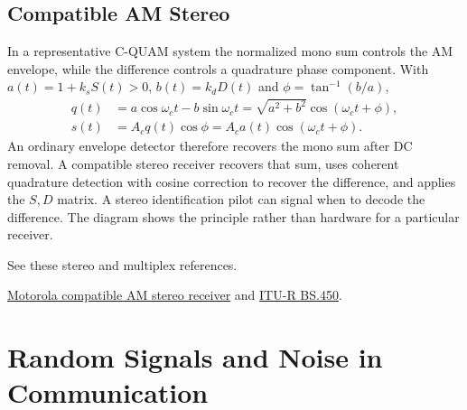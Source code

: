 \documentclass[12pt,a4paper]{article}
\begin{document}
\subsection{Compatible AM Stereo}
In a representative C-QUAM system the normalized mono sum controls the AM envelope, while the difference controls a quadrature phase component. With $a(t)=1+k_s S(t)>0$, $b(t)=k_dD(t)$ and $\phi=\tan^{-1}(b/a)$,
\[
\begin{aligned}
 q(t)&=a\cos\omega_ct-b\sin\omega_ct
      =\sqrt{a^2+b^2}\cos(\omega_ct+\phi),\\
 s(t)&=A_cq(t)\cos\phi
      =A_c a(t)\cos(\omega_ct+\phi).
\end{aligned}
\]
An ordinary envelope detector therefore recovers the mono sum after DC removal. A compatible stereo receiver recovers that sum, uses coherent quadrature detection with cosine correction to recover the difference, and applies the $S,D$ matrix. A stereo identification pilot can signal when to decode the difference. The diagram shows the principle rather than hardware for a particular receiver.

\begin{tcolorbox}[tikzbox, unbreakable, title={Compatible AM Stereo Signal Paths}]
\centering
{}\par
\end{tcolorbox}
\par\smallskip
{\small See these stereo and multiplex references.

\href{https://patents.google.com/patent/US4170716A/en}{Motorola compatible AM stereo receiver}
and \href{https://www.itu.int/rec/R-REC-BS.450/en}{ITU-R BS.450}.\par}

\section{Random Signals and Noise in Communication}
\end{document}
